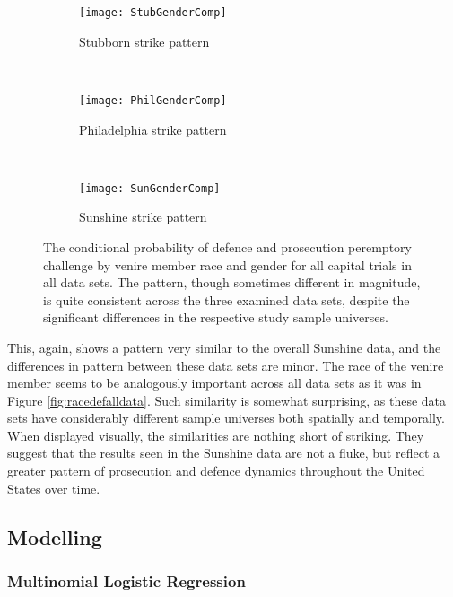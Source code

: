 \begin{figure}[h!]
  \centering
  \begin{subfigure}{0.4\textwidth}
    \texttt{[image: StubGenderComp]}
    \caption{\footnotesize Stubborn strike pattern}
    \label{fig:stubcompgen}
  \end{subfigure}
  ~
  \begin{subfigure}{0.4\textwidth}
    \texttt{[image: PhilGenderComp]}
    \caption{\footnotesize Philadelphia strike pattern}
    \label{fig:philcompgen}
  \end{subfigure}
  ~
  \begin{subfigure}{0.4\textwidth}
    \texttt{[image: SunGenderComp]}
    \caption{\footnotesize Sunshine strike pattern}
    \label{fig:suncompgen}
  \end{subfigure}
  \caption[Strikes by Race and Gender (All Capital Trial Data)]
  {\footnotesize The conditional probability of defence and prosecution peremptory challenge by venire member race and gender for
    all capital trials in all data sets. The pattern, though sometimes different in magnitude, is quite consistent across the three
    examined data sets, despite the significant differences in the respective study sample universes.}
  \label{fig:genderalldata}
\end{figure}

This, again, shows a pattern very similar to the overall Sunshine data, and the differences in pattern between these data sets are
minor. The race of the venire member seems to be analogously important across all data sets as it was in Figure
\ref{fig:racedefalldata}. Such similarity is somewhat surprising, as these data sets have considerably different sample
universes both spatially and temporally. When displayed visually, the similarities are
nothing short of striking. They suggest that the results seen in the Sunshine data are not a fluke, but reflect a greater pattern
of prosecution and defence dynamics throughout the United States over time.

\subsection{Modelling} \label{sec:mods}

\subsubsection{Multinomial Logistic Regression}

